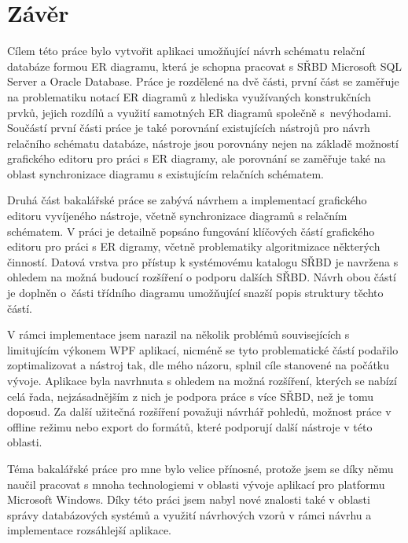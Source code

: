 \documentclass[czech,bachelor,public,dept460,male,oneside]{diploma}
\begin{document}
\section{Závěr}
Cílem této práce bylo vytvořit aplikaci umožňující návrh schématu relační databáze formou ER diagramu, která je schopna pracovat s SŘBD Microsoft SQL Server a Oracle Database. Práce je rozdělené na dvě části, první část se zaměřuje na problematiku notací ER diagramů z hlediska využívaných konstrukčních prvků, jejich rozdílů a využití samotných ER diagramů společně s~nevýhodami. Součástí první části práce je také porovnání existujících nástrojů pro návrh relačního schématu databáze, nástroje jsou porovnány nejen na základě možností grafického editoru pro práci s ER diagramy, ale porovnání se zaměřuje také na oblast synchronizace diagramu s existujícím relačních schématem.

Druhá část bakalářské práce se zabývá návrhem a implementací grafického editoru vyvíjeného nástroje, včetně synchronizace diagramů s relačním schématem. V práci je detailně popsáno fungování klíčových částí grafického editoru pro práci s ER digramy, včetně problematiky algoritmizace některých činností. Datová vrstva pro přístup k systémovému katalogu SŘBD je navržena s ohledem na možná budoucí rozšíření o podporu dalších SŘBD. Návrh obou částí je doplněn o~části třídního diagramu umožňující snazší popis struktury těchto částí.

V rámci implementace jsem narazil na několik problémů souvisejících s limitujícím výkonem WPF aplikací, nicméně se tyto problematické částí podařilo zoptimalizovat a nástroj tak, dle mého názoru, splnil cíle stanovené na počátku vývoje. Aplikace byla navrhnuta s ohledem na možná rozšíření, kterých se nabízí celá řada, nejzásadnějším z nich je podpora práce s více SŘBD, než je tomu doposud. Za další užitečná rozšíření považuji návrhář pohledů, možnost práce v offline režimu nebo export do formátů, které podporují další nástroje v této oblasti.

Téma bakalářské práce pro mne bylo velice přínosné, protože jsem se díky němu naučil pracovat s mnoha technologiemi v oblasti vývoje aplikací pro platformu Microsoft Windows. Díky této práci jsem nabyl nové znalosti také v oblasti správy databázových systémů a využití návrhových vzorů v rámci návrhu a implementace rozsáhlejší aplikace.
\end{document}
